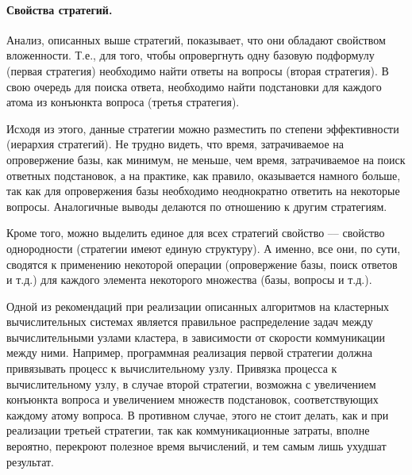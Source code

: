 \paragraph{Свойства стратегий.}

Анализ, описанных выше стратегий, показывает, что они обладают свойством вложенности. Т.е., для того, чтобы опровергнуть одну базовую подформулу (первая стратегия) необходимо найти ответы на вопросы (вторая стратегия). В свою очередь для поиска ответа, необходимо найти подстановки для каждого атома из конъюнкта вопроса (третья стратегия).

Исходя из этого, данные стратегии можно разместить по степени эффективности (иерархия стратегий). Не трудно видеть, что время, затрачиваемое на опровержение базы, как минимум, не меньше, чем время, затрачиваемое на поиск ответных подстановок, а на практике, как правило, оказывается намного больше, так как для опровержения базы необходимо неоднократно ответить на некоторые вопросы. Аналогичные выводы делаются по отношению к другим стратегиям.

Кроме того, можно выделить единое для всех стратегий свойство –-- свойство однородности (стратегии имеют единую структуру). А именно, все они, по сути, сводятся к применению некоторой операции (опровержение базы, поиск ответов и т.д.) для каждого элемента некоторого множества (базы, вопросы и т.д.).

Одной из рекомендаций при реализации описанных алгоритмов на кластерных вычислительных системах является правильное распределение задач между вычислительными узлами кластера, в зависимости от скорости коммуникации между ними. Например, программная реализация первой стратегии должна привязывать процесс к вычислительному узлу. Привязка процесса к вычислительному узлу, в случае второй стратегии, возможна с увеличением конъюнкта вопроса и увеличением множеств подстановок, соответствующих каждому атому вопроса. В противном случае, этого не стоит делать, как и  при реализации третьей стратегии, так как коммуникационные затраты, вполне вероятно, перекроют полезное время вычислений, и тем самым лишь ухудшат результат.





